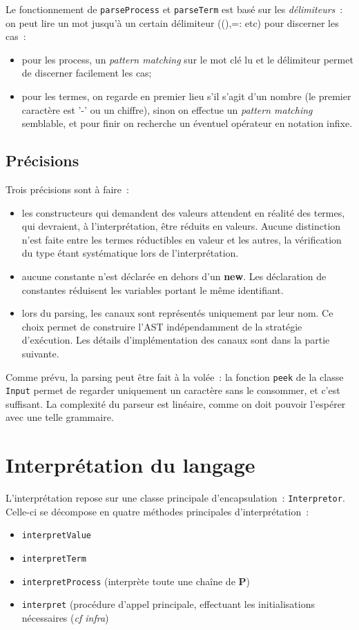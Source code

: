 \documentclass[11pt]{article} %
\begin{document}
Le fonctionnement de \texttt{parseProcess} et \texttt{parseTerm} est basé sur les \emph{délimiteurs}~: on peut lire un mot jusqu'à un certain délimiteur ((),=: etc) pour discerner les cas~:
\begin{itemize}
\item pour les process, un \emph{pattern matching} sur le mot clé lu et le délimiteur permet de discerner facilement les cas;
\item pour les termes, on regarde en premier lieu s'il s'agit d'un nombre (le premier caractère est '-' ou un chiffre), sinon on effectue un \emph{pattern matching} semblable, et pour finir on recherche un éventuel opérateur en notation infixe.
\end{itemize}

\subsection{Précisions}

Trois précisions sont à faire~:
\begin{itemize}
\item les constructeurs qui demandent des valeurs attendent en réalité des termes, qui devraient, à l'interprétation, être réduits en valeurs. Aucune distinction n'est faite entre les termes réductibles en valeur et les autres, la vérification du type étant systématique lors de l'interprétation.
\item aucune constante n'est déclarée en dehors d'un \textbf{new}. Les déclaration de constantes réduisent les variables portant le même identifiant.
\item lors du parsing, les canaux sont représentés uniquement par leur nom. Ce choix permet de construire l'AST indépendamment de la stratégie d'exécution. Les détails d'implémentation des canaux sont dans la partie suivante.
\end{itemize}

Comme prévu, la parsing peut être fait à la volée~: la fonction \texttt{peek} de la classe \texttt{Input} permet de regarder uniquement un caractère sans le consommer, et c'est suffisant. La complexité du parseur est linéaire, comme on doit pouvoir l'espérer avec une telle grammaire.

\section{Interprétation du langage}

  L'interprétation repose sur une classe principale d'encapsulation~: \texttt{Interpretor}.  Celle-ci se décompose en quatre méthodes principales d'interprétation~:
\begin{itemize}
  \item \texttt{interpretValue}
  \item \texttt{interpretTerm}
  \item \texttt{interpretProcess} (interprète toute une chaîne de \textbf{P})
  \item \texttt{interpret} (procédure d'appel principale, effectuant les initialisations nécessaires (\emph{cf infra})
\end{itemize}
\end{document}
